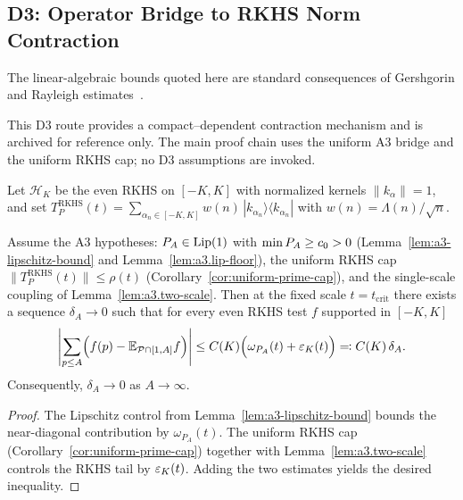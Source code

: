 \subsection{D3: Operator Bridge to RKHS Norm Contraction}\label{d3:sec:D3-operator}

The linear-algebraic bounds quoted here are standard consequences of Gershgorin and Rayleigh estimates~\cite{HornJohnson2013,Varga2004}.
\begin{remark}
This D3 route provides a compact--dependent contraction mechanism and is archived for reference only.
The main proof chain uses the uniform A3 bridge and the uniform RKHS cap; no D3 assumptions are invoked.
\end{remark}

Let $\mathcal H_K$ be the even RKHS on $[-K,K]$ with normalized kernels $\|k_\alpha\|=1$, and set
\(
T_P^{\mathrm{RKHS}}(t) = \sum_{\alpha_n\in[-K,K]} w(n)\,|k_{\alpha_n}\rangle\!\langle k_{\alpha_n}|
\)
with $w(n)=\Lambda(n)/\sqrt n$.

\begin{lemma}\label{d3:lem:D3-dispersion}
Assume the A3 hypotheses: $P_A\in\mathrm{Lip}(1)$ with $\min P_A\ge c_0>0$ (Lemma~\ref{lem:a3-lipschitz-bound} and Lemma~\ref{lem:a3.lip-floor}), the uniform RKHS cap $\|T_P^{\mathrm{RKHS}}(t)\|\le \rho(t)$ (Corollary~\ref{cor:uniform-prime-cap}), and the single-scale coupling of Lemma~\ref{lem:a3.two-scale}. Then at the fixed scale $t=t_{\mathrm{crit}}$ there exists a sequence $\delta_A\to0$ such that for every even RKHS test $f$ supported in $[-K,K]$
\[
  \Biggl|\sum_{p\le A}\Bigl(f(p)-\mathbb{E}_{\mathcal{P}\cap[1,A]}f\Bigr)\Biggr|
  \le C(K)\Bigl(\omega_{P_A}(t)+\varepsilon_{K}(t)\Bigr)
  \eqqcolon C(K)\,\delta_A.
\]
Consequently, $\delta_A\to0$ as $A\to\infty$.
\end{lemma}

\begin{proof}
The Lipschitz control from Lemma~\ref{lem:a3-lipschitz-bound} bounds the near-diagonal contribution by $\omega_{P_A}(t)$. The uniform RKHS cap (Corollary~\ref{cor:uniform-prime-cap}) together with Lemma~\ref{lem:a3.two-scale} controls the RKHS tail by $\varepsilon_{K}(t)$. Adding the two estimates yields the desired inequality.
\end{proof}

